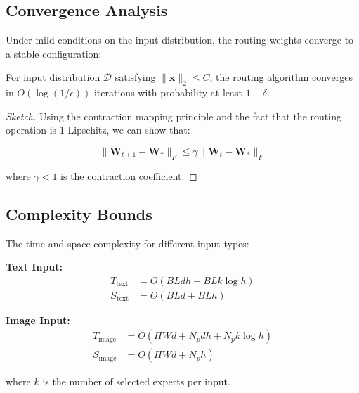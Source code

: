 \documentclass[10pt,journal,compsoc]{IEEEtran}
\begin{document}
\subsection{Convergence Analysis}
Under mild conditions on the input distribution, the routing weights converge to a stable configuration:

\begin{theorem}
For input distribution $\mathcal{D}$ satisfying $\|\mathbf{x}\|_2 \leq C$, the routing algorithm converges in $O(\log(1/\epsilon))$ iterations with probability at least $1-\delta$.
\end{theorem}

\begin{proof}[Sketch]
Using the contraction mapping principle and the fact that the routing operation is 1-Lipschitz, we can show that:

\begin{equation}
    \|\mathbf{W}_{t+1} - \mathbf{W}_*\|_F \leq \gamma\|\mathbf{W}_t - \mathbf{W}_*\|_F
\end{equation}

where $\gamma < 1$ is the contraction coefficient.
\end{proof}

\subsection{Complexity Bounds}
The time and space complexity for different input types:

\textbf{Text Input:}
\begin{align}
    T_{\text{text}} &= O(BLdh + BLk\log h) \\
    S_{\text{text}} &= O(BLd + BLh)
\end{align}

\textbf{Image Input:}
\begin{align}
    T_{\text{image}} &= O(HWd + N_pdh + N_pk\log h) \\
    S_{\text{image}} &= O(HWd + N_ph)
\end{align}

where $k$ is the number of selected experts per input.
\end{document}
